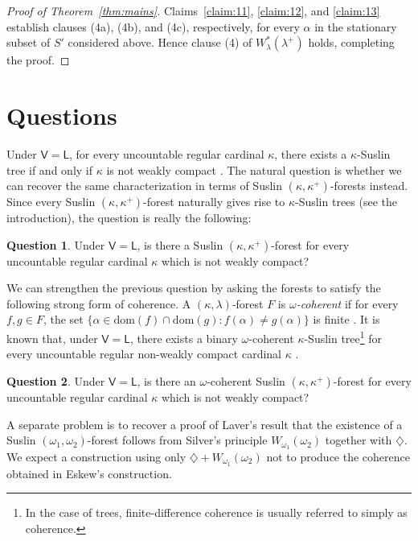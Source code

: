 \documentclass[]{amsart}
\theoremstyle{definition}
\newtheorem{question}{Question}
\theoremstyle{remark}
\begin{document}
\begin{proof}[Proof of Theorem~\ref{thm:mains}]
Claims~\ref{claim:11}, \ref{claim:12}, and \ref{claim:13} establish clauses (4a), (4b), and (4c), respectively, for every \(\alpha\) in the stationary subset of $S'$ considered above. Hence clause (4) of $W^*_\lambda(\lambda^+)$ holds, completing the proof.
\end{proof}
\endgroup
\section{Questions}\label{sec:questions}

Under $\mathsf{V=L}$, for every uncountable regular cardinal $\kappa$, there exists a $\kappa$-Suslin tree if and only if $\kappa$ is not weakly compact \cites{MR309729, MR3692231}. The natural question is whether we can recover the same characterization in terms of Suslin $(\kappa, \kappa^+)$-forests instead. Since every Suslin $(\kappa, \kappa^+)$-forest naturally gives rise to $\kappa$-Suslin trees (see the introduction), the question is really the following:
\begin{question}
Under $\mathsf{V=L}$, is there a Suslin $(\kappa, \kappa^+)$-forest for every uncountable regular cardinal $\kappa$ which is not weakly compact?
\end{question}

We can strengthen the previous question by asking the forests to satisfy the following strong form of coherence. A $(\kappa, \lambda)$-forest $F$ is \emph{$\omega$-coherent} if for every  $f,g \in F$, the set $\{\alpha \in \mathrm{dom}(f) \cap \mathrm{dom}(g) : f(\alpha) \neq g(\alpha)\}$ is finite \cite{MR3326048}. It is known that, under $\mathsf{V=L}$, there exists a binary $\omega$-coherent $\kappa$-Suslin tree\footnote{In the case of trees, finite-difference coherence is usually referred to simply as coherence.} for every uncountable regular non-weakly compact cardinal $\kappa$  \cite{MR3692231}.


\begin{question}
Under $\mathsf{V=L}$, is there an $\omega$-coherent Suslin $(\kappa, \kappa^+)$-forest for every uncountable regular cardinal $\kappa$ which is not weakly compact?
\end{question}

A separate problem is to recover a proof of Laver's result that the existence of a Suslin $(\omega_1, \omega_2)$-forest follows from Silver's principle $W_{\omega_1}(\omega_2)$ together with $\diamondsuit$. We expect a construction using only $\diamondsuit + W_{\omega_1}(\omega_2)$ not to produce the coherence obtained in Eskew's construction.
\end{document}
